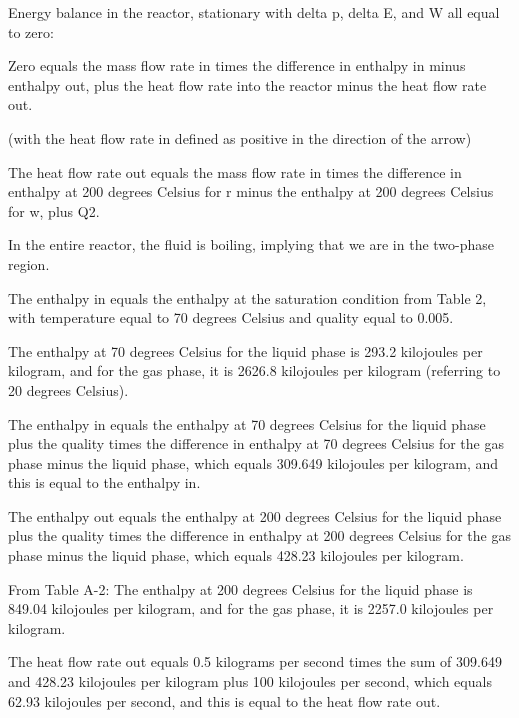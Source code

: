 Energy balance in the reactor, stationary with delta p, delta E, and W all equal to zero:

Zero equals the mass flow rate in times the difference in enthalpy in minus enthalpy out, plus the heat flow rate into the reactor minus the heat flow rate out.

(with the heat flow rate in defined as positive in the direction of the arrow)

The heat flow rate out equals the mass flow rate in times the difference in enthalpy at 200 degrees Celsius for r minus the enthalpy at 200 degrees Celsius for w, plus Q2.

In the entire reactor, the fluid is boiling, implying that we are in the two-phase region.

The enthalpy in equals the enthalpy at the saturation condition from Table 2, with temperature equal to 70 degrees Celsius and quality equal to 0.005.

The enthalpy at 70 degrees Celsius for the liquid phase is 293.2 kilojoules per kilogram, and for the gas phase, it is 2626.8 kilojoules per kilogram (referring to 20 degrees Celsius).

The enthalpy in equals the enthalpy at 70 degrees Celsius for the liquid phase plus the quality times the difference in enthalpy at 70 degrees Celsius for the gas phase minus the liquid phase, which equals 309.649 kilojoules per kilogram, and this is equal to the enthalpy in.

The enthalpy out equals the enthalpy at 200 degrees Celsius for the liquid phase plus the quality times the difference in enthalpy at 200 degrees Celsius for the gas phase minus the liquid phase, which equals 428.23 kilojoules per kilogram.

From Table A-2: The enthalpy at 200 degrees Celsius for the liquid phase is 849.04 kilojoules per kilogram, and for the gas phase, it is 2257.0 kilojoules per kilogram.

The heat flow rate out equals 0.5 kilograms per second times the sum of 309.649 and 428.23 kilojoules per kilogram plus 100 kilojoules per second, which equals 62.93 kilojoules per second, and this is equal to the heat flow rate out.